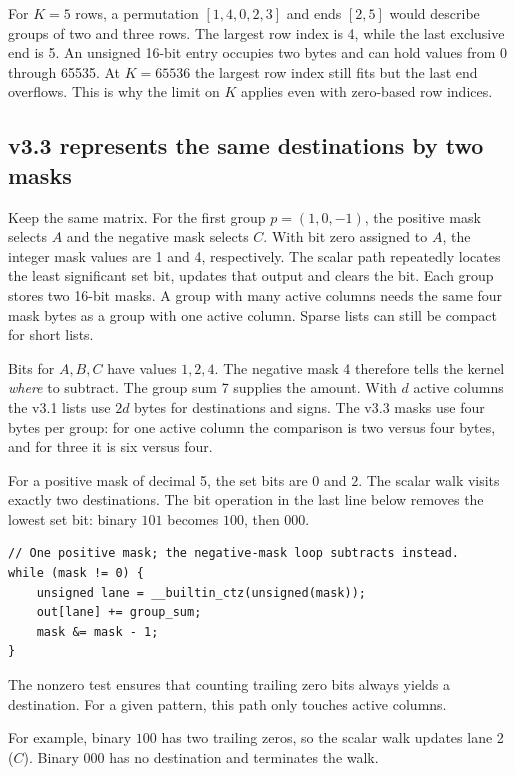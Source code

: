 \documentclass[11pt,a4paper]{article}
\begin{document}
For \(K=5\) rows, a permutation \([1,4,0,2,3]\) and ends \([2,5]\)
would describe groups of two and three rows. The largest row index is 4,
while the last exclusive end is 5. An unsigned 16-bit entry occupies
two bytes and can hold values from 0 through 65535. At \(K=65536\) the
largest row index still fits but the last end overflows. This is why
the limit on \(K\) applies even with zero-based row indices.

\subsection{v3.3 represents the same destinations by two masks}
Keep the same matrix. For the first group \(p=(1,0,-1)\), the positive mask
selects \(A\) and the negative mask selects \(C\). With bit zero assigned
to \(A\), the integer mask values are 1 and 4, respectively.
The scalar path repeatedly locates the least significant set bit, updates
that output and clears the bit. Each group stores two 16-bit masks.
A group with many active columns needs the same four mask bytes as a group
with one active column. Sparse lists can still be compact for short lists.

Bits for \(A,B,C\) have values \(1,2,4\). The negative mask 4 therefore
tells the kernel \emph{where} to subtract. The group sum 7 supplies the
amount. With \(d\) active columns the v3.1 lists use \(2d\) bytes for
destinations and signs. The v3.3 masks use four bytes per group: for
one active column the comparison is two versus four bytes, and for three
it is six versus four.

For a positive mask of decimal 5, the set bits are \(0\) and \(2\).
The scalar walk visits exactly two destinations. The bit operation in
the last line below removes the lowest set bit: binary \(101\) becomes
\(100\), then \(000\).
\begin{lstlisting}
// One positive mask; the negative-mask loop subtracts instead.
while (mask != 0) {
    unsigned lane = __builtin_ctz(unsigned(mask));
    out[lane] += group_sum;
    mask &= mask - 1;
}
\end{lstlisting}
The nonzero test ensures that counting trailing zero bits always yields
a destination. For a given pattern, this path only touches active columns.

For example, binary \(100\) has two trailing zeros, so the scalar walk
updates lane 2 (\(C\)). Binary \(000\) has no destination and terminates
the walk.
\end{document}
